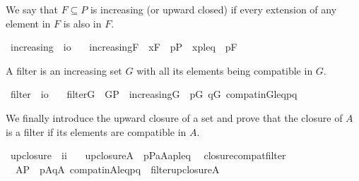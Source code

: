 We say that $F\subseteq P$ is increasing (or upward closed) if every
extension of any element in $F$ is also in $F$.
\begin{isabelle}
\isamarkupfalse%
\ increasing\ {\isacharcolon}{\isacharcolon}\ {\isachardoublequoteopen}i{\isasymRightarrow}o{\isachardoublequoteclose}\ \isanewline
\ \ {\isachardoublequoteopen}increasing{\isacharparenleft}F{\isacharparenright}\ {\isacharequal}{\isacharequal}\ {\isasymforall}x{\isasymin}F{\isachardot}\ {\isasymforall}\ p{\isasymin}P\ {\isachardot}\ {\isasymlangle}x{\isacharcomma}p{\isasymrangle}{\isasymin}leq\ {\isasymlongrightarrow}\ p{\isasymin}F{\isachardoublequoteclose}
\end{isabelle}
A filter is an increasing set $G$ with all its elements being compatible in $G$.
\begin{isabelle}
\isamarkupfalse%
\ filter\ {\isacharcolon}{\isacharcolon}\ {\isachardoublequoteopen}i{\isasymRightarrow}o{\isachardoublequoteclose}\ \isanewline
\ \ {\isachardoublequoteopen}filter{\isacharparenleft}G{\isacharparenright}\ {\isacharequal}{\isacharequal}\ G{\isasymsubseteq}P\ {\isasymand}\ increasing{\isacharparenleft}G{\isacharparenright}\ {\isasymand}\ {\isacharparenleft}{\isasymforall}p{\isasymin}G{\isachardot}\ {\isasymforall}q{\isasymin}G{\isachardot}\ compat{\isacharunderscore}in{\isacharparenleft}G{\isacharcomma}leq{\isacharcomma}p{\isacharcomma}q{\isacharparenright}{\isacharparenright}{\isachardoublequoteclose}
\end{isabelle}

We finally introduce the upward closure of a set
and prove that the closure of $A$ is a filter if its elements are
compatible in $A$.
\begin{isabelle}
\isamarkupfalse%
\ upclosure\ {\isacharcolon}{\isacharcolon}\ {\isachardoublequoteopen}i{\isasymRightarrow}i{\isachardoublequoteclose}\ \isanewline
\ \ {\isachardoublequoteopen}upclosure{\isacharparenleft}A{\isacharparenright}\ {\isacharequal}{\isacharequal}\ {\isacharbraceleft}p{\isasymin}P{\isachardot}{\isasymexists}a{\isasymin}A{\isachardot}{\isasymlangle}a{\isacharcomma}p{\isasymrangle}{\isasymin}leq{\isacharbraceright}{\isachardoublequoteclose}\isanewline
{}\isamarkupfalse%
\ \ closure{\isacharunderscore}compat{\isacharunderscore}filter{\isacharcolon}
\ \ {\isachardoublequoteopen}A{\isasymsubseteq}P\ {\isasymLongrightarrow}\ {\isacharparenleft}{\isasymforall}p{\isasymin}A{\isachardot}{\isasymforall}q{\isasymin}A{\isachardot}\ compat{\isacharunderscore}in{\isacharparenleft}A{\isacharcomma}leq{\isacharcomma}p{\isacharcomma}q{\isacharparenright}{\isacharparenright}\ {\isasymLongrightarrow}\ filter{\isacharparenleft}upclosure{\isacharparenleft}A{\isacharparenright}{\isacharparenright}{\isachardoublequoteclose}
\end{isabelle}



